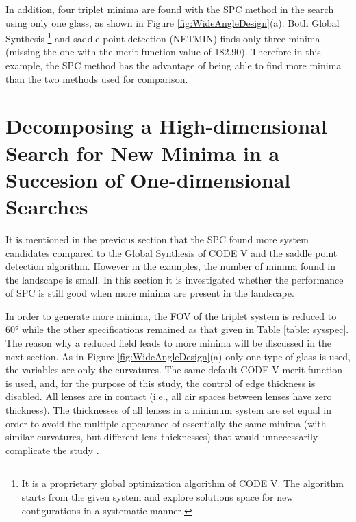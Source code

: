 In addition, four triplet minima are found with the SPC method in the search using only one glass, as shown in Figure \ref{fig:WideAngleDesign}(a). Both Global Synthesis \footnote{It is a proprietary global optimization algorithm of CODE V. The algorithm starts from the given system and explore solutions space for new configurations in a systematic manner.} and saddle point detection
(NETMIN) finds only three minima (missing the one with the merit function value of 182.90). Therefore in this example, the SPC method has the advantage of being able to find more minima than the two methods used for comparison. 

\section{Decomposing a High-dimensional Search for New Minima in a Succesion of One-dimensional Searches}  \label{chrom60d}

It is mentioned in the previous section that the SPC found more system candidates compared to the Global Synthesis of CODE V and the saddle point detection algorithm. However in the examples, the number of minima found in the landscape is small. In this section it is investigated whether the performance of SPC is still good when more minima are present in the landscape.

In order to generate more minima, the FOV of the triplet system is reduced to 60° while the other specifications remained as that given in Table \ref{table: sysspec}. The reason why a reduced
field leads to more minima will be discussed in the next section.
As in Figure \ref{fig:WideAngleDesign}(a) only one type of glass is used, the variables are only the curvatures. The same default CODE V merit function is used, and, for the purpose of this study, the control of edge thickness is disabled. All lenses are in contact (i.e., all air spaces between lenses have zero thickness). The thicknesses of all lenses in a minimum system are set equal in order to avoid the multiple appearance of essentially the same minima (with similar curvatures, but different lens thicknesses) that would unnecessarily complicate the study \cite{HouProc2015}.

